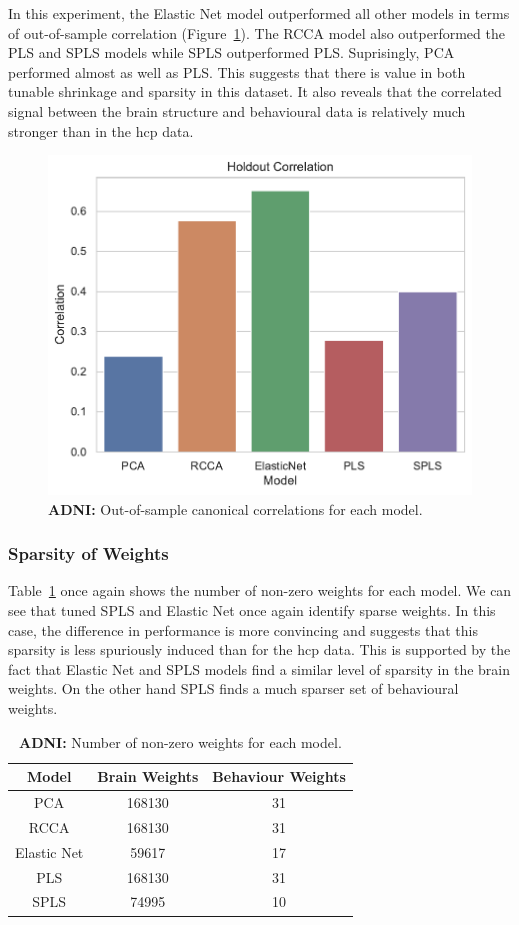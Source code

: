 In this experiment, the Elastic Net model outperformed all other models in terms of out-of-sample correlation (Figure~\ref{fig:performance}).
The RCCA model also outperformed the PLS and SPLS models while SPLS outperformed PLS.
Suprisingly, PCA performed almost as well as PLS.
This suggests that there is value in both tunable shrinkage and sparsity in this dataset.
It also reveals that the correlated signal between the brain structure and behavioural data is relatively much stronger than in the \acrshort{hcp} data.

\begin{figure}
    \centering
    \includegraphics[width=0.5\linewidth]{figures/adni/holdout_correlations}
    \caption{\textbf{ADNI:} Out-of-sample canonical correlations for each model.}\label{fig:performance}
\end{figure}

\subsubsection{Sparsity of Weights}

Table~\ref{tab:brain-behaviour-weights-adni} once again shows the number of non-zero \gls{weights} for each model.
We can see that tuned SPLS and Elastic Net once again identify sparse weights.
In this case, the difference in performance is more convincing and suggests that this sparsity is less spuriously induced than for the \acrshort{hcp} data.
This is supported by the fact that Elastic Net and SPLS models find a similar level of sparsity in the brain weights.
On the other hand SPLS finds a much sparser set of behavioural weights.

\begin{table}
    \centering
    \caption{\textbf{ADNI:} Number of non-zero \gls{weights} for each model.}
    \begin{tabular}{|c|c|c|}
        \hline
        Model       & Brain Weights & Behaviour Weights \\
        \hline
        PCA         & 168130        & 31                \\
        RCCA        & 168130        & 31                \\
        Elastic Net & 59617         & 17                \\
        PLS         & 168130        & 31                \\
        SPLS        & 74995         & 10                \\
        \hline
    \end{tabular}\label{tab:brain-behaviour-weights-adni}
\end{table}

